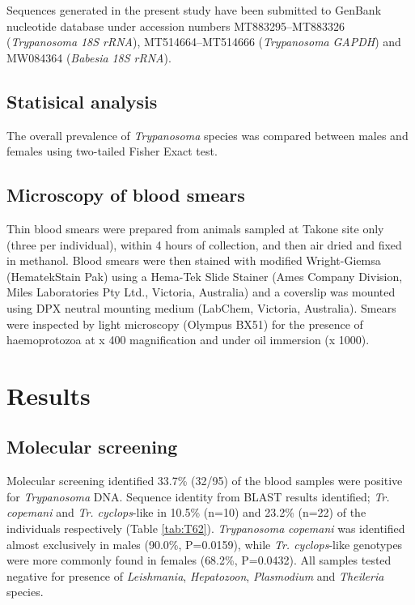 \documentclass[a4paper, nobind]{templates/ociamthesis}
\begin{document}
Sequences generated in the present study have been submitted to GenBank nucleotide database under accession numbers MT883295--MT883326 (\emph{Trypanosoma} \emph{18S rRNA}), MT514664--MT514666 (\emph{Trypanosoma} \emph{GAPDH}) and MW084364 (\emph{Babesia} \emph{18S rRNA}).

\hypertarget{statisical-analysis}{%
\subsection{Statisical analysis}\label{statisical-analysis}}

The overall prevalence of \emph{Trypanosoma} species was compared between males and females using two-tailed Fisher Exact test.

\hypertarget{microscopy-of-blood-smears}{%
\subsection{Microscopy of blood smears}\label{microscopy-of-blood-smears}}

Thin blood smears were prepared from animals sampled at Takone site only (three per individual), within 4 hours of collection, and then air dried and fixed in methanol. Blood smears were then stained with modified Wright-Giemsa (Hematek\textregistered Stain Pak) using a Hema-Tek Slide Stainer (Ames Company Division, Miles Laboratories Pty Ltd., Victoria, Australia) and a coverslip was mounted using DPX neutral mounting medium (LabChem, Victoria, Australia). Smears were inspected by light microscopy (Olympus BX51) for the presence of haemoprotozoa at x 400 magnification and under oil immersion (x 1000).

\hypertarget{results-2}{%
\section{Results}\label{results-2}}

\hypertarget{molecular-screening-1}{%
\subsection{Molecular screening}\label{molecular-screening-1}}

Molecular screening identified 33.7\% (32/95) of the blood samples were positive for \emph{Trypanosoma} DNA. Sequence identity from BLAST results identified; \emph{Tr. copemani} and \emph{Tr. cyclops}-like in 10.5\% (n=10) and 23.2\% (n=22) of the individuals respectively (Table \ref{tab:T62}). \emph{Trypanosoma} \emph{copemani} was identified almost exclusively in males (90.0\%, P=0.0159), while \emph{Tr. cyclops}-like genotypes were more commonly found in females (68.2\%, P=0.0432). All samples tested negative for presence of \emph{Leishmania}, \emph{Hepatozoon}, \emph{Plasmodium} and \emph{Theileria} species.
\end{document}

